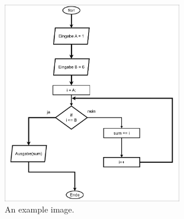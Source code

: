 \documentclass{article}  %
\begin{document}
\begin{figure} %
    \centering
    \includegraphics[width=7.8cm]{example-image.png} %
    \caption{An example image.}
    \label{fig:example}
\end{figure}
\end{document}
